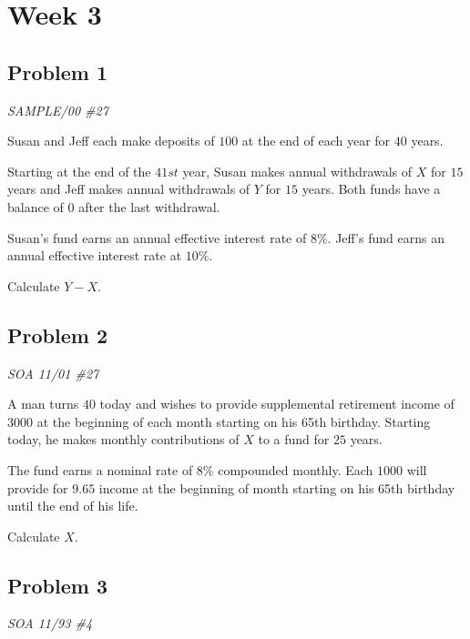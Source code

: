 \documentclass[
]{book}
\begin{document}
\hypertarget{week-3}{%
\section*{Week 3}\label{week-3}}

\hypertarget{problem-1-1}{%
\subsection*{Problem 1}\label{problem-1-1}}

\emph{SAMPLE/00 \#27}

Susan and Jeff each make deposits of \(100\) at the end of each year for \(40\) years.

Starting at the end of the \(41st\) year, Susan makes annual withdrawals of \(X\) for \(15\) years and Jeff makes annual withdrawals of \(Y\) for \(15\) years. Both funds have a balance of \(0\) after the last withdrawal.

Susan's fund earns an annual effective interest rate of \(8\%\). Jeff's fund earns an annual effective interest rate at \(10\%\).

Calculate \(Y-X\).

\hypertarget{problem-2-1}{%
\subsection*{Problem 2}\label{problem-2-1}}

\emph{SOA 11/01 \#27}

A man turns \(40\) today and wishes to provide supplemental retirement income of \(3000\) at the beginning of each month starting on his 65th birthday. Starting today, he makes monthly contributions of \(X\) to a fund for \(25\) years.

The fund earns a nominal rate of \(8\%\) compounded monthly. Each \(1000\) will provide for \(9.65\) income at the beginning of month starting on his 65th birthday until the end of his life.

Calculate \(X\).

\hypertarget{problem-3-1}{%
\subsection*{Problem 3}\label{problem-3-1}}

\emph{SOA 11/93 \#4}
\end{document}

